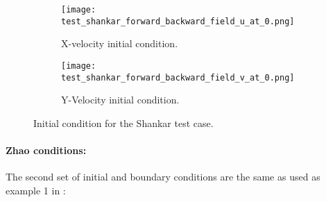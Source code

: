 \begin{figure}
\centering
\begin{subfigure}{.5\textwidth}
  \centering
  \texttt{[image: test\_shankar\_forward\_backward\_field\_u\_at\_0.png]}
  \caption{X-velocity initial condition.}
  \label{fig:shankar_ic1}
\end{subfigure}%
\begin{subfigure}{.5\textwidth}
  \centering
  \texttt{[image: test\_shankar\_forward\_backward\_field\_v\_at\_0.png]}
  \caption{Y-Velocity initial condition.}
  \label{fig:shankar_ic2}
\end{subfigure}
\caption{Initial condition for the Shankar test case.}
\label{fig:shankar_ic}
\end{figure}

\newpage
\paragraph{Zhao conditions:}

The second set of initial and boundary conditions are the same as used as example 1 in \citet{zhao2011new}:

